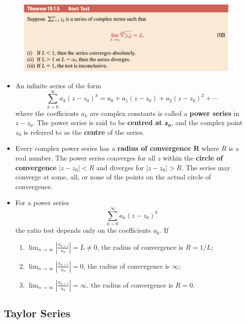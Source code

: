 \documentclass{article}
\begin{document}
\begin{figure}[H]
  \centering
  \includegraphics[width=\textwidth]{root-test}
\end{figure}

\begin{itemize}
  \item An infinite series of the form \[\sum_{k = 0}^\infty a_k (z - z_0)^k = a_0 + a_1 (z - z_0) + a_2 (z - z_0)^2 + \cdots\] where the coefficients $a_k$ are complex constants is called a \textbf{power series} in $z - z_0$. The power series is said to be \textbf{centred at $\boldsymbol{z_0}$}, and the complex point $z_0$ is referred to as the \textbf{centre} of the series.

  \item Every complex power series has a \textbf{radius of convergence $\boldsymbol{R}$} where $R$ is a real number. The power series converges for all $z$ within the \textbf{circle of convergence} $|z - z_0| < R$ and diverges for $|z - z_0| > R$. The series may converge at some, all, or none of the points on the actual circle of convergence.

  \item For a power series \[\sum_{k = 0}^\infty a_k (z - z_0)^k\] the ratio test depends only on the coefficients $a_k$. If \begin{enumerate}
          \item $\lim_{n \rightarrow \infty} \left| \frac{a_{n + 1}}{a_n} \right| = L \ne 0$, the radius of convergence is $R = 1 / L$;

          \item $\lim_{n \rightarrow \infty} \left| \frac{a_{n + 1}}{a_n} \right| = 0$, the radius of convergence is $\infty$;

          \item $\lim_{n \rightarrow \infty} \left| \frac{a_{n + 1}}{a_n} \right| = \infty$, the radius of convergence is $R = 0$.
        \end{enumerate}
\end{itemize}

\subsection{Taylor Series}
\end{document}
